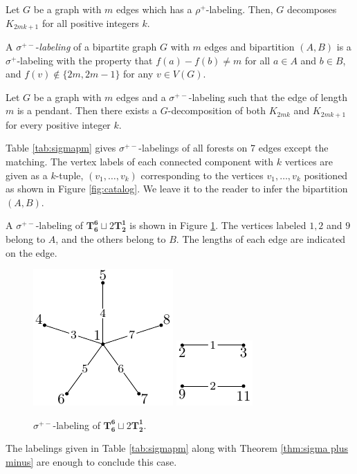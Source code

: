 \begin{thm} \label{thm:rho plus}
Let $G$ be a graph with $m$ edges which has a $\rho^+$-labeling. Then, $G$ decomposes $K_{2mk+1}$ for all positive integers $k$.
\end{thm}

\begin{definition} \label{def:sigma plus minus} 
A $\sigma^{+-}$-\emph{labeling} of a bipartite graph $G$ with $m$ edges and bipartition $(A,B)$ is a $\sigma^+$-labeling with the property that $f(a) - f(b) \neq m$ for all $a \in A$ and $b \in B$, and $f(v) \not\in \{2m,2m-1\}$ for any $v\in V(G)$.
\end{definition}

\begin{thm} \label{thm:sigma plus minus}
Let $G$ be a graph with $m$ edges and a $\sigma^{+-}$-labeling such that the edge of length $m$ is a pendant. Then there exists a $G$-decomposition of both $K_{2mk}$ and $K_{2mk+1}$ for every positive integer $k$.
\end{thm}

Table \ref{tab:sigmapm} gives $\sigma^{+-}$-labelings of all forests on 7 edges except the matching. The vertex labels of each connected component with $k$ vertices are given as a $k$-tuple, $(v_1,\dots ,v_k)$ corresponding to the vertices $v_1, \dots, v_k$ positioned as shown in Figure \ref{fig:catalog}. We leave it to the reader to infer the bipartition $(A,B)$. 
\begin{example}
    A $\sigma^{+-}$-labeling of $\mathbf{T_{6}^{6}}\sqcup 2\mathbf{T_{2}^{1}}$ is shown in Figure \ref{fig:sigma label ex}. The vertices labeled $1,2$ and $9$ belong to $A$, and the others belong to $B$. The lengths of each edge are indicated on the edge.
    \begin{figure}[H]
        \centering
        \includegraphics[scale=1.0]{standalone/sigma label ex1.pdf}
         \includegraphics[scale=1.0]{standalone/sigma label ex2.pdf}
        \caption{$\sigma^{+-}$-labeling of $\mathbf{T_{6}^{6}}\sqcup 2\mathbf{T_{2}^{1}}$.}
        \label{fig:sigma label ex}
    \end{figure}
\end{example}
\newpage
 The labelings given in Table \ref{tab:sigmapm} along with Theorem \ref{thm:sigma plus minus} are enough to conclude this case.


